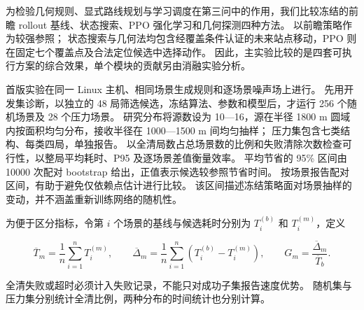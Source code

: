 为检验几何规则、显式路线规划与学习调度在第三问中的作用，我们比较冻结的前瞻 rollout 基线、状态搜索、PPO 强化学习和几何探测四种方法。
以前瞻策略作为较强参照；
状态搜索与几何法均包含经覆盖条件认证的未来站点移动，PPO 则在固定七个覆盖点及合法定位候选中选择动作。
因此，主实验比较的是四套可执行方案的综合效果，单个模块的贡献另由消融实验分析。

首版实验在同一 Linux 主机、相同场景生成规则和逐场景噪声场上进行。
先用开发集诊断，以独立的 48 局筛选候选，冻结算法、参数和模型后，才运行 256 个随机场景及 28 个压力场景。
研究分布将源数设为 10---16，源在半径 1800 m 圆域内按面积均匀分布，接收半径在 1000---1500 m 间均匀抽样；
压力集包含七类结构、每类四局，单独报告。
以全清局数占总场景数的比例和失败清除次数检查可行性，以整局平均耗时、P95 及逐场景差值衡量效率。
平均节省的 95\% 区间由 10000 次配对 bootstrap 给出，正值表示候选较参照节省时间。
按场景报告配对区间，有助于避免仅依赖点估计进行比较\cite{agarwal2021}。
该区间描述冻结策略面对场景抽样的变动，并不涵盖重新训练网络的随机性。

为便于区分指标，令第 \(i\) 个场景的基线与候选耗时分别为 \(T_i^{(b)}\) 和 \(T_i^{(m)}\)，定义

\begin{equation}\label{eq:q3-17}
\overline T_m=\frac1n\sum_{i=1}^nT_i^{(m)},\qquad
\overline\Delta_m=\frac1n\sum_{i=1}^n(T_i^{(b)}-T_i^{(m)}),\qquad
G_m=\frac{\overline\Delta_m}{\overline T_b}.
\end{equation}

全清失败或超时必须计入失败记录，不能只对成功子集报告速度优势。
随机集与压力集分别统计全清比例，两种分布的时间统计也分别计算。

\Needspace{82mm}
